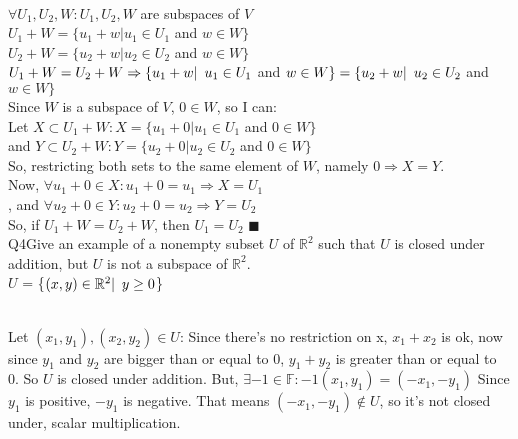 \documentclass{article}
\begin{document}
\\
$\forall U_1, U_2, W: U_1, U_2, W$ are subspaces of $V$\\
$U_1 + W = \{u_1 + w | u_1 \in U_1 $ and $ w \in W\}$\\
$U_2 + W = \{u_2 + w | u_2 \in U_2 $ and $ w \in W\}$\\
$U_1 + W = U_2 + W \\ \Rightarrow\{u_1 + w |\enskip u_1 \in U_1 $ and $ w
\in W\} = \{u_2 + w |\enskip u_2 \in U_2 $ and $ w \in W\}$\\
Since $W$ is a subspace of $V$, $0 \in W$, so I can:\\
Let $X \subset U_1 + W: X = \{u_1 + 0 | u_1 \in U_1$ and $0 \in W \}$\\
and $Y \subset U_2 + W: Y = \{u_2 + 0 | u_2 \in U_2$ and $0 \in W \}$\\
So, restricting both sets to the same element of $W$, namely $0
\Rightarrow X=Y$.\\
Now, $\forall u_1 + 0 \in X: u_1 + 0 = u_1 \Rightarrow X = U_1$\\
, and $\forall u_2 + 0 \in Y: u_2 + 0 = u_2 \Rightarrow Y = U_2$\\
So, if $U_1 + W = U_2 + W$, then $U_1 = U_2$ $\blacksquare$\\

\newpage
Q4\quad Give an example of a nonempty subset $U$ of $\mathbb{R}^2$ such that $U$ is
closed under addition, but $U$ is not a subspace of $\mathbb{R}^2$.\\

\color{gray}$U$\color{black} = \{$(x,y)\in \mathbb{R}^2 |\enskip y \geq 0$\}\\
\\
Let $(x_1,y_1),(x_2,y_2) \in U$: Since there's no restriction on x,
$x_1+x_2$ is ok, now since $y_1$ and $y_2$ are bigger than or equal to
0, $y_1+y_2$ is greater than or equal to 0. So $U$ is closed under
addition. But, $\exists -1 \in \mathbb{F}: -1(x_1,y_1) = (-x_1,-y_1)$
Since $y_1$ is positive, $-y_1$ is negative. That means $(-x_1,-y_1)
\notin U$, so it's not closed under, scalar multiplication.\\
\end{document}
